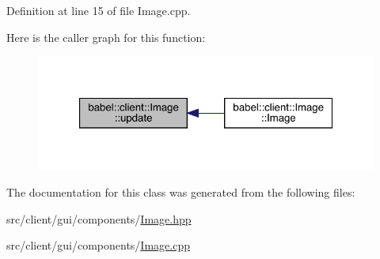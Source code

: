 Definition at line 15 of file Image.\+cpp.

Here is the caller graph for this function\+:\nopagebreak
\begin{figure}[H]
\begin{center}
\leavevmode
\includegraphics[width=321pt]{classbabel_1_1client_1_1_image_a1d1329ab093dbd0383a60b96a7fcf862_icgraph}
\end{center}
\end{figure}


The documentation for this class was generated from the following files\+:\begin{DoxyCompactItemize}
\item 
src/client/gui/components/\mbox{\hyperlink{_image_8hpp}{Image.\+hpp}}\item 
src/client/gui/components/\mbox{\hyperlink{_image_8cpp}{Image.\+cpp}}\end{DoxyCompactItemize}
